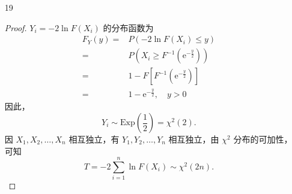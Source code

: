 \documentclass[normal,founder,mtpro2,cn]{elegantnote}
\begin{document}
\begin{enumerate}
\begin{proof}
            因此，
            \begin{equation*}
                \begin{aligned}
                    E\left(F^{r}\right)= & \frac{m^{r}}{k^{r}}E\left(v^{r}\right)\cdot E\left(w^{-r}\right)                                                                                \\
                    =                    & \frac{m^{r}\Gamma\left(\frac{k}{2}+r\right)\Gamma\left(\frac{m}{2}-r\right)}{k^{r}\Gamma\left(\frac{k}{2}\right)\Gamma\left(\frac{m}{2}\right)}
                \end{aligned}
            \end{equation*}

        \end{proof}
    \item[19]
        \begin{proof}
            $Y_{i}=-2\ln F\left(X_{i}\right)$ 的分布函数为
            \begin{equation*}
                \begin{aligned}
                    F_{Y}(y)= & P\left(-2\ln F\left(X_{i}\right)\leq y\right)                        \\
                    =         & P\left(X_{i}\geq F^{-1}\left(\mathrm{e}^{-\frac{y}{2}}\right)\right) \\
                    =         & 1-F\left[F^{-1}\left(\mathrm{e}^{-\frac{y}{2}}\right)\right]         \\
                    =         & 1-\mathrm{e}^{-\frac{y}{2}},\quad y>0
                \end{aligned}
            \end{equation*}
            因此，
            \begin{equation*}
                Y_{i}\sim\text{Exp}\left(\frac{1}{2}\right)=\chi^{2}(2).
            \end{equation*}
            因 $X_{1},X_{2},\ldots,X_{n}$ 相互独立，有 $Y_{1},Y_{2},\ldots,Y_{n}$ 相互独立，由 $\chi^{2}$ 分布的可加性，可知
            \begin{equation*}
                T=-2\sum_{i=1}^{n}\ln F\left(X_{i}\right)\sim\chi^{2}(2n).
            \end{equation*}
        \end{proof}
\end{enumerate}
\end{document}

